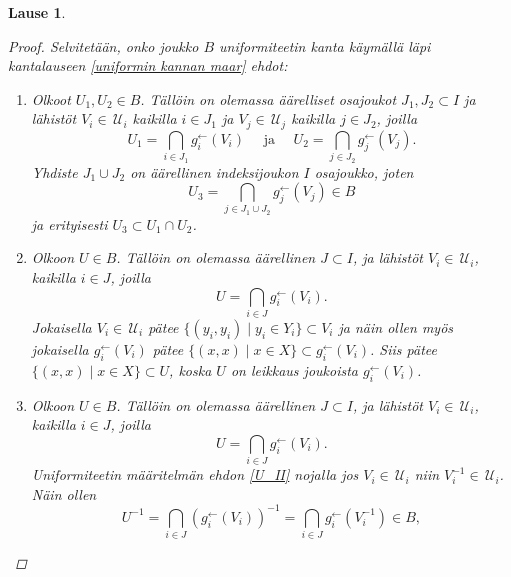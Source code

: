 \documentclass[12pt,a4paper,leqno]{report}
\newcommand{\U}{\,\mathcal{U}}
\theoremstyle{plain}
\newtheorem{lause}[equation]{Lause}
\theoremstyle{definition}
\theoremstyle{remark}
\begin{document}
\begin{lause}
\begin{proof}
Selvitetään, onko joukko $B$ uniformiteetin kanta käymällä läpi 
kantalauseen \ref{uniformin kannan maar} ehdot:
\begin{enumerate} %
\item[\ref{B_I}] 
Olkoot $U_1,U_2\in B$. 
Tällöin on olemassa äärelliset osajoukot $J_1,J_2\subset I$ 
ja lähistöt $V_i\in\U_i$ kaikilla $i\in J_1$ 
ja $V_j\in\U_j$ kaikilla $j\in J_2$, 
joilla 
\begin{equation*}
U_1=\bigcap_{i\in J_1}g^{\leftarrow}_{i}(V_{i})\quad\text{ ja 
 }\quad U_2=\bigcap_{j\in J_2}g^{\leftarrow}_{j}(V_{j}).
\end{equation*}
Yhdiste $J_1\cup J_2$ on äärellinen indeksijoukon $I$ osajoukko, 
joten 
 $$U_3=\bigcap_{j\in J_1\cup J_2}g^{\leftarrow}_{j}(V_{j})\in B$$
 ja erityisesti $U_3\subset U_1\cap U_2$.
\item[\ref{U'_I}] 
Olkoon $U\in B$. Tällöin on olemassa äärellinen $J\subset I$, 
ja lähistöt $V_i\in\U_i$, kaikilla $i\in J$, 
joilla
\begin{equation*}
U=\bigcap_{i\in J}g^{\leftarrow}_{i}(V_{i}).
\end{equation*}
Jokaisella $V_i\in \U_i$ pätee $\{(y_i,y_i)\mid y_i\in Y_i\}\subset V_i$ 
ja näin ollen myös jokaisella $g_i^{\leftarrow}(V_i)$ pätee 
$\{(x,x)\mid x\in X\}\subset g_i^{\leftarrow}(V_i)$. 
Siis pätee $\{(x,x)\mid x\in X\}\subset U$, 
koska $U$ on leikkaus joukoista $g_i^{\leftarrow}(V_i)$.
\item[\ref{U'_II}] 
Olkoon $U\in B$. Tällöin on olemassa äärellinen $J\subset I$, 
ja lähistöt $V_i\in\U_i$, kaikilla $i\in J$, 
joilla
\begin{equation*}
U=\bigcap_{i\in J}g^{\leftarrow}_{i}(V_{i}).
\end{equation*}
Uniformiteetin määritelmän ehdon \ref{U_II} nojalla jos $V_i\in\U_i$ niin $V^{-1}_i\in\U_i$. 
Näin ollen 
\begin{equation*}
U^{-1}=\bigcap_{i\in J}(g^{\leftarrow}_{i}(V_{i}))^{-1}
=\bigcap_{i\in J}g^{\leftarrow}_{i}(V^{-1}_{i})\in B,

\end{equation*}
\end{enumerate}
\end{proof}
\end{lause}
\end{document}
